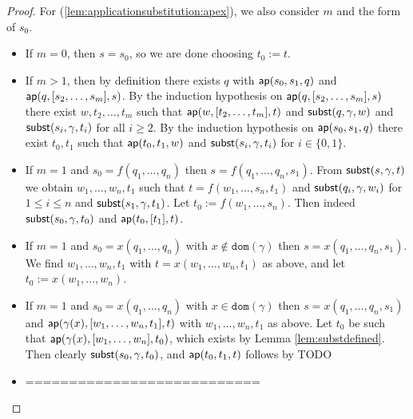 \documentclass{lmcs}
\theoremstyle{theorem}\newtheorem{theorem}[dummy]{Theorem}
\theoremstyle{theorem}\newtheorem{lemma}[dummy]{Lemma}
\theoremstyle{theorem}\newtheorem{corollary}[dummy]{Corollary}
\theoremstyle{definition}\newtheorem{definition}[dummy]{Definition}
\theoremstyle{definition}\newtheorem{example}[dummy]{Example}
\newcommand{\domain}{\mathtt{dom}}
\begin{document}
\begin{proof}
For (\ref{lem:applicationsubstitution:apex}), we also consider $m$ and the form of $s_0$.
\begin{itemize}
\item If $m = 0$, then $s = s_0$, so we are done choosing $t_0 := t$.
\item If $m > 1$, then by definition there exists $q$ with $\mathsf{ap}(s_0,s_1,q)$ and
  $\mathsf{ap}(q,[s_2,\dots,s_m],s)$. By the induction hypothesis on $\mathsf{ap}(q,[s_2,\dots,s_m],s)$
  there exist $w,t_2,\dots,t_m$ such that $\mathsf{ap}(w,[t_2,\dots,t_m],t)$ and $\mathsf{subst}(q,\gamma,w)$
  and $\mathsf{subst}(s_i,\gamma,t_i)$ for all $i \geq 2$. By the induction hypothesis on
  $\mathsf{ap}(s_0,s_1,q)$ there exist $t_0,t_1$ such that $\mathsf{ap}(t_0,t_1,w)$ and $\mathsf{subst}(s_i,
  \gamma,t_i)$ for $i \in \{0,1\}$.
\item If $m = 1$ and $s_0 = f(q_1,\dots,q_n)$ then $s = f(q_1,\dots,q_n,s_1)$.
  From $\mathsf{subst}(s,\gamma,t)$ we obtain $w_1,\dots,w_n,t_1$ such that $t = f(w_1,\dots,s_n,t_1)$ and
  $\mathsf{subst}(q_i,\gamma,w_i)$ for $1 \leq i \leq n$ and $\mathsf{subst}(s_1,\gamma,t_1)$.
  Let $t_0 := f(w_1,\dots,s_n)$. Then indeed $\mathsf{subst}(s_0,\gamma,t_0)$ and $\mathsf{ap}(t_0,[t_1],t)$.
\item If $m = 1$ and $s_0 = x(q_1,\dots,q_n)$ with $x \notin \domain(\gamma)$ then $s = x(q_1,
  \dots,q_n,s_1)$.  We find $w_1,\dots,w_n,t_1$ with $t = x(w_1,\dots,w_n,t_1)$ as above, and let
  $t_0 := x(w_1,\dots,w_n)$.
\item If $m = 1$ and $s_0 = x(q_1,\dots,q_n)$ with $x \in \domain(\gamma)$ then $s = x(q_1,\dots,
  q_n,s_1)$ and $\mathsf{ap}(\gamma(x),[w_1,\dots,w_n,t_1],t)$ with $w_1,\dots,w_n,t_1$ as above.
  Let $t_0$ be such that $\mathsf{ap}(\gamma(x),[w_1,\dots,w_n],t_0)$, which exists by Lemma
  \ref{lem:substdefined}.  Then clearly $\mathsf{subst}(s_0,\gamma,t_0)$, and $\mathsf{ap}(t_0,t_1,t)$ follows
  by TODO
\item ===========================
\end{itemize}


\end{proof}
\end{document}
